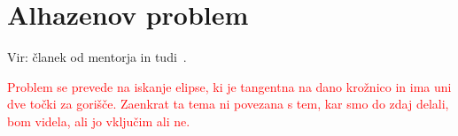 \section{Alhazenov problem}

Vir: članek od mentorja in tudi~\cite[str.\ 137--139]{geometricconstructions}.

\textcolor{red}{Problem se prevede na iskanje elipse, ki je tangentna na dano krožnico in ima uni dve točki za gorišče. Zaenkrat ta tema ni povezana s tem, kar smo do zdaj delali, bom videla, ali jo vključim ali ne.}